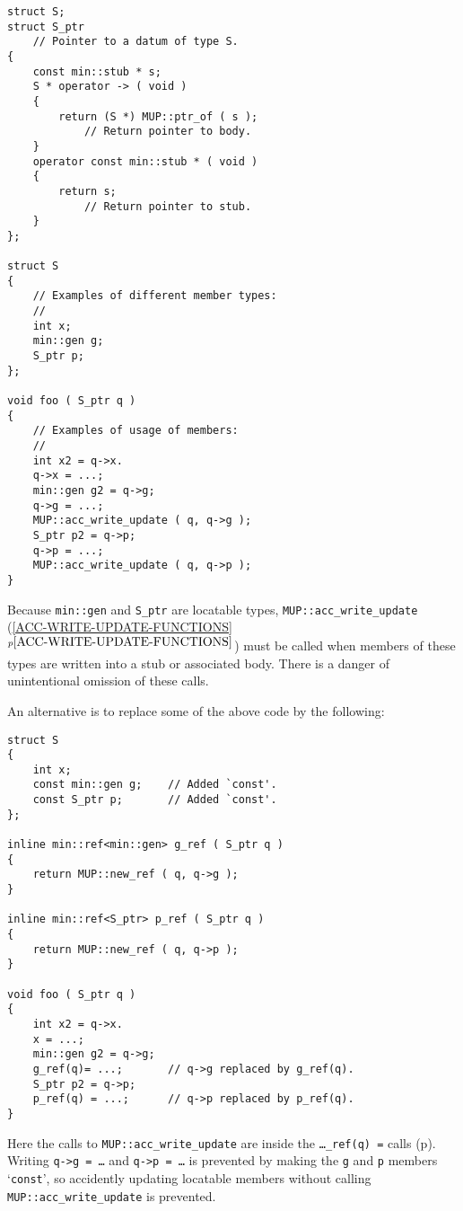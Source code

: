 \documentclass[12pt]{article}
\newcommand{\itemref}[1]{\ref{#1}$^{p\pageref{#1}}$}
\newcommand{\pagref}[1]{p\pageref{#1}}
\newcommand{\EOL}{\penalty \exhyphenpenalty}
\newenvironment{indpar}[1][0.3in]%
	{\begin{list}{}%
		     {\setlength{\itemsep}{0in}%
		      \setlength{\topsep}{0in}%
		      \setlength{\parsep}{1ex}%
		      \setlength{\labelwidth}{#1}%
		      \setlength{\leftmargin}{#1}%
		      \addtolength{\leftmargin}{\labelsep}}%
	 \item}%
	{\end{list}}
\begin{document}
\begin{indpar}\begin{verbatim}
struct S;
struct S_ptr
    // Pointer to a datum of type S.
{
    const min::stub * s;
    S * operator -> ( void )
    {
        return (S *) MUP::ptr_of ( s );
            // Return pointer to body.
    }
    operator const min::stub * ( void )
    {
        return s;
            // Return pointer to stub.
    }
};

struct S
{
    // Examples of different member types:
    //
    int x;
    min::gen g;
    S_ptr p;
};

void foo ( S_ptr q )
{
    // Examples of usage of members:
    //
    int x2 = q->x.
    q->x = ...;
    min::gen g2 = q->g;
    q->g = ...;
    MUP::acc_write_update ( q, q->g );
    S_ptr p2 = q->p;
    q->p = ...;
    MUP::acc_write_update ( q, q->p );
}
\end{verbatim}\end{indpar}

Because {\tt min::gen} and {\tt S\_ptr} are locatable types,
{\tt MUP::\EOL acc\_\EOL write\_\EOL update}
(\itemref{ACC-WRITE-UPDATE-FUNCTIONS}) must be called when
members of these types are written into a stub or associated body.  There is
a danger of unintentional omission of these calls.

An alternative is to replace some of the above code by the following:

\begin{indpar}\begin{verbatim}
struct S
{
    int x;
    const min::gen g;    // Added `const'.
    const S_ptr p;       // Added `const'.
};

inline min::ref<min::gen> g_ref ( S_ptr q )
{
    return MUP::new_ref ( q, q->g );
}

inline min::ref<S_ptr> p_ref ( S_ptr q )
{
    return MUP::new_ref ( q, q->p );
}

void foo ( S_ptr q )
{
    int x2 = q->x.
    x = ...;
    min::gen g2 = q->g;
    g_ref(q)= ...;       // q->g replaced by g_ref(q).
    S_ptr p2 = q->p;
    p_ref(q) = ...;      // q->p replaced by p_ref(q).
}
\end{verbatim}\end{indpar}

Here the calls to {\tt MUP::acc\_write\_update} are inside the
{\tt \ldots\_ref(q) =} calls (\pagref{LOCATABLE_REF}).
Writing {\tt q->g = \ldots}
and {\tt q->p = \ldots} is prevented by making the {\tt g} and {\tt p}
members `{\tt const}', so accidently updating locatable members
without calling {\tt MUP::\EOL acc\_\EOL write\_\EOL update}
is prevented.
\end{document}
